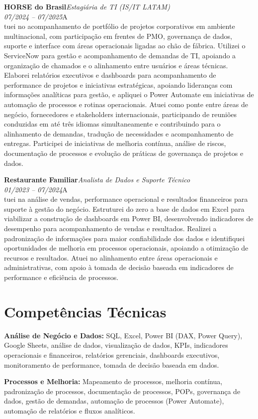 \documentclass[11pt,a4paper]{article}
\newcommand{\cvrole}[4]{%
  \vspace{4pt}%
  {\bfseries\color{accentcolor}#1}\hfill{\itshape #2}\\[-2pt]%
  {\itshape #3}\hfill #4\\[6pt]%
}
\begin{document}
\cvrole{HORSE do Brasil}{Estagiária de TI (IS/IT LATAM)}{07/2024 -- 07/2025}

Atuei no acompanhamento de portfólio de projetos corporativos em ambiente multinacional, com participação em frentes de PMO, governança de dados, suporte e interface com áreas operacionais ligadas ao chão de fábrica. Utilizei o ServiceNow para gestão e acompanhamento de demandas de TI, apoiando a organização de chamados e o alinhamento entre usuários e áreas técnicas. Elaborei relatórios executivos e dashboards para acompanhamento de performance de projetos e iniciativas estratégicas, apoiando lideranças com informações analíticas para gestão, e apliquei o Power Automate em iniciativas de automação de processos e rotinas operacionais. Atuei como ponte entre áreas de negócio, fornecedores e stakeholders internacionais, participando de reuniões conduzidas em até três idiomas simultaneamente e contribuindo para o alinhamento de demandas, tradução de necessidades e acompanhamento de entregas. Participei de iniciativas de melhoria contínua, análise de riscos, documentação de processos e evolução de práticas de governança de projetos e dados.

\cvrole{Restaurante Familiar}{Analista de Dados e Suporte Técnico}{01/2023 -- 07/2024}

Atuei na análise de vendas, performance operacional e resultados financeiros para suporte à gestão do negócio. Estruturei do zero a base de dados em Excel para viabilizar a construção de dashboards em Power BI, desenvolvendo indicadores de desempenho para acompanhamento de vendas e resultados. Realizei a padronização de informações para maior confiabilidade dos dados e identifiquei oportunidades de melhoria em processos operacionais, apoiando a otimização de recursos e resultados. Atuei no alinhamento entre áreas operacionais e administrativas, com apoio à tomada de decisão baseada em indicadores de performance e eficiência de processos.

\section{Competências Técnicas}

\textbf{Análise de Negócio e Dados:} SQL, Excel, Power BI (DAX, Power Query), Google Sheets, análise de dados, visualização de dados, KPIs, indicadores operacionais e financeiros, relatórios gerenciais, dashboards executivos, monitoramento de performance, tomada de decisão baseada em dados.

\textbf{Processos e Melhoria:} Mapeamento de processos, melhoria contínua, padronização de processos, documentação de processos, POPs, governança de dados, gestão de demandas, automação de processos (Power Automate), automação de relatórios e fluxos analíticos.
\end{document}
